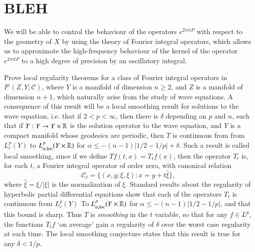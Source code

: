 %
%


\section{BLEH}

We will be able to control the behaviour of the operators $e^{2 \pi i t P}$ with respect to the geometry of $X$ by using the theory of Fourier integral operators, which allows us to approximate the high-frequency behaviour of the kernel of the operator $e^{2 \pi i t P}$ to a high degree of precision by an oscillatory integral.

Prove local regularity theorems for a class of Fourier integral operators in $I^\mu(Z,Y;\mathcal{C})$, where $Y$ is a manifold of dimension $n \geq 2$, and $Z$ is a manifold of dimension $n+1$, which naturally arise from the study of wave equations. A consequence of this result will be a local smoothing result for solutions to the wave equation, i.e. that if $2 < p < \infty$, then there is $\delta$ depending on $p$ and $n$, such that if $T: Y \to Y \times \operatorname{\mathbb{R}}$ is the solution operator to the wave equation, and $Y$ is a compact manifold whose geodesics are periodic, then $T$ is continuous from from $L^p_c(Y)$ to $L^p_{\alpha,\text{loc}}(Y \times \operatorname{\mathbb{R}})$ for $\alpha \leq -(n-1)|1/2 - 1/p| + \delta$. Such a result is called local smoothing, since if we define $Tf(t,x) = T_tf(x)$, then the operator $T_t$ is, for each $t$, a Fourier integral operator of order zero, with canonical relation
%
\[ \mathcal{C}_t = \{ (x,y;\xi,\xi) : x = y + t \widehat{\xi} \}, \]
%
where $\widehat{\xi} = \xi / |\xi|$ is the normalization of $\xi$. Standard results about the regularity of hyperbolic partial differential equations show that each of the operators $T_t$ is continuous from $L^p_c(Y)$ To $L^p_{\alpha,\text{loc}}(Y \times \operatorname{\mathbb{R}})$ for $\alpha \leq -(n-1)|1/2 - 1/p|$, and that this bound is sharp. Thus $T$ is \emph{smoothing} in the $t$ variable, so that for any $f \in L^p$, the functions $T_t f$ `on average' gain a regularity of $\delta$ over the worst case regularity at each time. The local smoothing conjecture states that this result is true for any $\delta < 1/p$.

